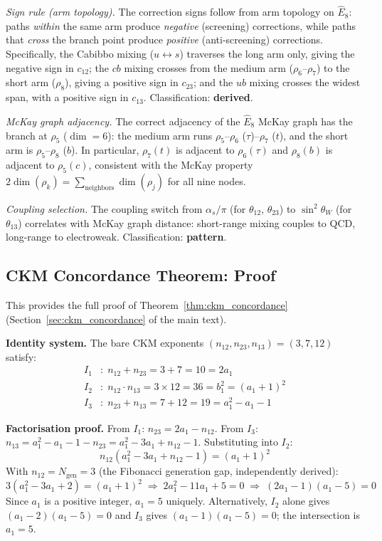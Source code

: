 \documentclass[12pt,a4paper]{article}
\theoremstyle{definition}
\begin{document}
\textit{Sign rule (arm topology).}  The correction signs follow from arm topology on $\hat{E}_8$: paths \emph{within} the same arm produce \emph{negative} (screening) corrections, while paths that \emph{cross} the branch point produce \emph{positive} (anti-screening) corrections.  Specifically, the Cabibbo mixing ($u \leftrightarrow s$) traverses the long arm only, giving the negative sign in $c_{12}$; the $cb$ mixing crosses from the medium arm ($\rho_6$--$\rho_7$) to the short arm ($\rho_8$), giving a positive sign in $c_{23}$; and the $ub$ mixing crosses the widest span, with a positive sign in $c_{13}$.  Classification: \textbf{derived}.

\textit{McKay graph adjacency.}  The correct adjacency of the $\hat{E}_8$ McKay graph has the branch at $\rho_5$ ($\dim = 6$): the medium arm runs $\rho_5$--$\rho_6$ ($\tau$)--$\rho_7$ ($t$), and the short arm is $\rho_5$--$\rho_8$ ($b$).  In particular, $\rho_7(t)$ is adjacent to $\rho_6(\tau)$ and $\rho_8(b)$ is adjacent to $\rho_5(c)$, consistent with the McKay property $2\dim(\rho_k) = \sum_{\text{neighbors}} \dim(\rho_j)$ for all nine nodes.

\textit{Coupling selection.}  The coupling switch from $\alpha_s/\pi$ (for $\theta_{12}$, $\theta_{23}$) to $\sin^2\theta_W$ (for $\theta_{13}$) correlates with McKay graph distance: short-range mixing couples to QCD, long-range to electroweak.  Classification: \textbf{pattern}.

\subsection{CKM Concordance Theorem: Proof}
\label{sec:S-ckm-concordance}

This provides the full proof of Theorem~\ref{thm:ckm_concordance} (Section~\ref{sec:ckm_concordance} of the main text).

\textbf{Identity system.}  The bare CKM exponents $(n_{12}, n_{23}, n_{13}) = (3, 7, 12)$ satisfy:
\begin{align}
I_1&\colon\; n_{12} + n_{23} = 3 + 7 = 10 = 2a_1 \\
I_2&\colon\; n_{12} \cdot n_{13} = 3 \times 12 = 36 = b_1^2 = (a_1+1)^2 \\
I_3&\colon\; n_{23} + n_{13} = 7 + 12 = 19 = a_1^2 - a_1 - 1
\end{align}

\textbf{Factorisation proof.}  From $I_1$: $n_{23} = 2a_1 - n_{12}$.  From $I_3$: $n_{13} = a_1^2 - a_1 - 1 - n_{23} = a_1^2 - 3a_1 + n_{12} - 1$.  Substituting into $I_2$:
\begin{equation}
n_{12}(a_1^2 - 3a_1 + n_{12} - 1) = (a_1+1)^2
\end{equation}
With $n_{12} = N_{\text{gen}} = 3$ (the Fibonacci generation gap, independently derived):
\[
3(a_1^2 - 3a_1 + 2) = (a_1+1)^2 \;\Longrightarrow\; 2a_1^2 - 11a_1 + 5 = 0 \;\Longrightarrow\; (2a_1 - 1)(a_1 - 5) = 0
\]
Since $a_1$ is a positive integer, $a_1 = 5$ uniquely.  Alternatively, $I_2$ alone gives $(a_1-2)(a_1-5) = 0$ and $I_3$ gives $(a_1-1)(a_1-5) = 0$; the intersection is $a_1 = 5$.
\end{document}
